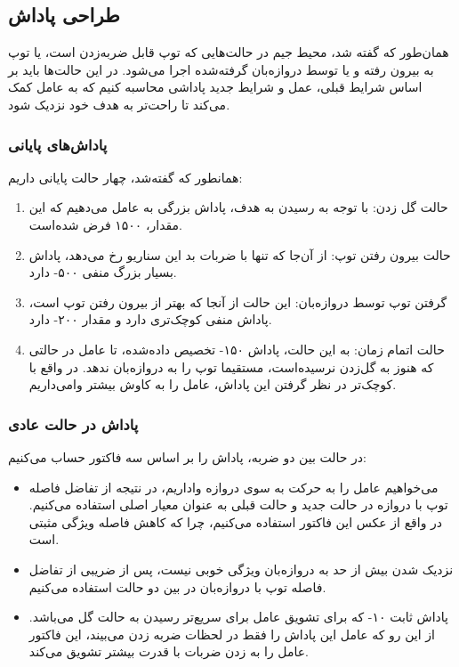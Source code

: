 \subsection{طراحی پاداش}
همان‌طور که گفته شد، محیط جیم در حالت‌هایی که توپ قابل ضربه‌زدن است، یا توپ به بیرون رفته و یا توسط دروازه‌بان گرفته‌شده اجرا می‌شود.
در این حالت‌ها باید بر اساس شرایط قبلی، عمل و شرایط جدید پاداشی محاسبه کنیم که به عامل کمک می‌کند تا راحت‌تر به هدف خود نزدیک شود.
\subsubsection{پاداش‌های پایانی}
همانطور که گفته‌شد، چهار حالت پایانی داریم:
\begin{enumerate}
    \item حالت گل زدن: با توجه به رسیدن به هدف، پاداش بزرگی به عامل می‌دهیم که این مقدار، ۱۵۰۰ فرض شده‌است.
    \item حالت بیرون رفتن توپ: از آن‌جا که تنها با ضربات بد این سناریو رخ می‌دهد، پاداش بسیار بزرگ منفی ۵۰۰- دارد.
    \item گرفتن توپ توسط دروازه‌بان: این حالت از آنجا که بهتر از بیرون رفتن توپ است، پاداش منفی کوچک‌تری دارد و مقدار ۲۰۰- دارد.
    \item حالت اتمام زمان: به این حالت، پاداش ۱۵۰- تخصیص داده‌شده، تا عامل در حالتی که هنوز به گل‌زدن نرسیده‌است، مستقیما توپ را به دروازه‌بان ندهد. در واقع با کوچک‌تر در نظر گرفتن این پاداش، عامل را به کاوش بیشتر وا‌می‌داریم.
\end{enumerate}
\subsubsection{پاداش در حالت عادی}
در حالت بین دو ضربه، پاداش را بر اساس سه فاکتور حساب می‌کنیم:
\begin{itemize}
    \item می‌خواهیم عامل را به حرکت به سوی دروازه واداریم، در نتیجه از تفاضل فاصله توپ با دروازه در حالت جدید و حالت قبلی به عنوان معیار اصلی استفاده می‌کنیم. در واقع از عکس این فاکتور استفاده می‌کنیم، چرا که کاهش فاصله ویژگی مثبتی است.
    \item نزدیک شدن بیش از حد به دروازه‌بان ویژگی خوبی نیست، پس از ضریبی از تفاضل فاصله توپ با دروازه‌بان در بین دو حالت استفاده می‌کنیم.
    \item پاداش ثابت ۱۰- که برای تشویق عامل برای سریع‌تر رسیدن به حالت گل می‌باشد. از این رو که عامل این پاداش را فقط در لحظات ضربه زدن می‌بیند، این فاکتور عامل را به زدن ضربات با قدرت بیشتر تشویق می‌کند.
\end{itemize}
